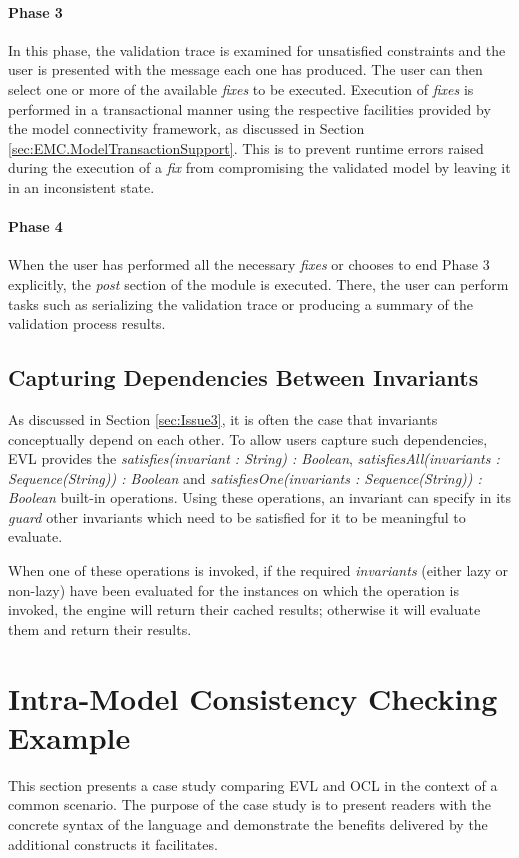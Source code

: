 \paragraph{Phase 3} In this phase, the validation trace is examined for unsatisfied constraints and the user is presented with the message each one has produced. The user can then select one or more of the available \emph{fixes} to be executed. Execution of \emph{fixes} is performed in a transactional manner using the respective facilities provided by the model connectivity framework, as discussed in Section \ref{sec:EMC.ModelTransactionSupport}. This is to prevent runtime errors raised during the execution of a \emph{fix} from compromising the validated model by leaving it in an inconsistent state.

\paragraph{Phase 4} When the user has performed all the necessary \emph{fixes} or chooses to end Phase 3 explicitly, the \emph{post} section of the module is executed. There, the user can perform tasks such as serializing the validation trace or producing a summary of the validation process results.

\subsection{Capturing Dependencies Between Invariants}

As discussed in Section \ref{sec:Issue3}, it is often the case that invariants conceptually depend on each other. To allow users capture such dependencies, EVL provides the \emph{satisfies(invariant : String) : Boolean}, \emph{satisfiesAll(invariants : Sequence(String)) : Boolean} and \emph{satisfiesOne(invariants : Sequence(String)) : Boolean} built-in operations. Using these operations, an invariant can specify in its \emph{guard} other invariants which need to be satisfied for it to be meaningful to evaluate.

When one of these operations is invoked, if the required \emph{invariants} (either lazy or non-lazy) have been evaluated for the instances on which the operation is invoked, the engine will return their cached results; otherwise it will evaluate them and return their results.

\section{Intra-Model Consistency Checking Example}
\label{sec:EvlIntraModelExample}
This section presents a case study comparing EVL and OCL in the context of a common scenario. The purpose of the case study is to present readers with the concrete syntax of the language and demonstrate the benefits delivered by the additional constructs it facilitates.

